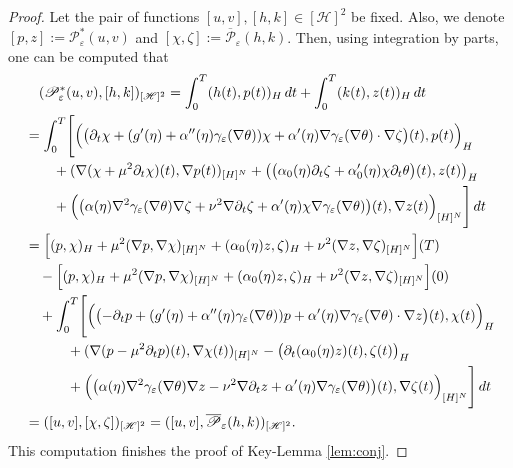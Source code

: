 \documentclass{sinst}
\numberwithin{equation}{section}
\theoremstyle{plain}
\theoremstyle{definition}
\def\sH{\mathscr{H}}
\def\sP{\mathscr{P}}
\begin{document}
\begin{proof}
  Let the pair of functions $[u,v], [h,k] \in [\sH]^2$ be fixed. Also, we denote $[p,z] := \sP_\varepsilon^*(u,v)$ and $[\chi,\zeta] := \overline{\sP}_\varepsilon(h,k)$. Then, using integration by parts, one can be computed that
  \begin{align}
    &\quad (\sP_\varepsilon^*(u,v), [h,k])_{[\sH]^2} = \int_0^T (h(t),p(t))_H \,dt + \int_0^T (k(t), z(t))_H \,dt
    \\
    &= \int_0^T \Biggl[\Bigl(\bigl(\partial_t \chi + (g'(\eta) + \alpha''(\eta) \gamma_\varepsilon(\nabla \theta))\chi + \alpha'(\eta)\nabla \gamma_\varepsilon(\nabla \theta) \cdot \nabla \zeta\bigr)(t), p(t)\Bigr)_H
    \\
    &\qquad + (\nabla (\chi + \mu^2 \partial_t \chi)(t), \nabla p(t))_{[H]^N} + \bigl( \bigl( \alpha_0(\eta) \partial_t \zeta + \alpha_0'(\eta) \chi \partial_t \theta \bigr)(t), z(t)\bigr)_H 
    \\
    &\qquad + \Bigl(\bigl( \alpha(\eta) \nabla^2 \gamma_\varepsilon(\nabla \theta) \nabla \zeta + \nu^2 \nabla \partial_t \zeta + \alpha'(\eta) \chi \nabla \gamma_\varepsilon(\nabla \theta) \bigr)(t), \nabla z(t)\Bigr)_{[H]^N} \Biggr]\,dt
    \\
    &= \Bigl[ (p,\chi)_H + \mu^2(\nabla p, \nabla \chi)_{[H]^N} + (\alpha_0(\eta)z,\zeta)_H + \nu^2 (\nabla z, \nabla \zeta)_{[H]^N} \Bigr](T)
    \\
    &\quad - \Bigl[ (p,\chi)_H + \mu^2(\nabla p, \nabla \chi)_{[H]^N} + (\alpha_0(\eta)z,\zeta)_H + \nu^2 (\nabla z, \nabla \zeta)_{[H]^N} \Bigr](0)
    \\
    &\quad + \int_0^T \Biggl[\Bigl(\bigl(-\partial_t p + (g'(\eta) + \alpha''(\eta) \gamma_\varepsilon(\nabla \theta))p + \alpha'(\eta) \nabla \gamma_\varepsilon(\nabla \theta) \cdot \nabla z\bigr)(t), \chi(t) \Bigr)_H 
    \\
    &\quad\qquad + (\nabla (p - \mu^2 \partial_t p)(t), \nabla \chi(t))_{[H]^N} - \bigl( \partial_t (\alpha_0(\eta) z)(t), \zeta(t) \bigr)_H
    \\
    &\quad\qquad + \Bigl(\bigl(\alpha(\eta) \nabla^2 \gamma_\varepsilon(\nabla \theta) \nabla z - \nu^2 \nabla \partial_t z + \alpha'(\eta) \nabla \gamma_\varepsilon(\nabla \theta)\bigr)(t), \nabla \zeta(t)\Bigr)_{[H]^N} \Biggr]\,dt 
    \\
    &= ([u,v], [\chi,\zeta])_{[\sH]^2} = ([u,v], \overline{\sP}_\varepsilon(h,k))_{[\sH]^2}.
  \end{align}
  This computation finishes the proof of Key-Lemma \ref{lem:conj}.
\end{proof}
\end{document}
